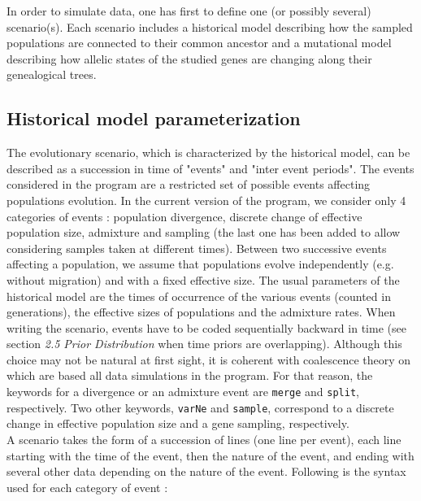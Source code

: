  
 In order to simulate data, one has first to define one (or possibly
several) scenario(s). Each scenario includes a historical model describing
how the sampled populations  are connected to their common ancestor
and a mutational model describing how allelic states of the studied
genes are changing along their genealogical trees.\\

\subsection{Historical model parameterization}
The evolutionary scenario, which is characterized by the historical
model, can be described as a succession in time of "events" and
"inter event periods". The events considered in the program are a
restricted set of possible events affecting populations evolution.
In the current version of the program, we consider only 4 categories
of events : population divergence, 
discrete change of effective population size, admixture and sampling (the last one has been added
to allow considering samples taken at different times). Between two successive
events affecting a population, we assume that populations evolve
independently (e.g. without migration) and with a fixed effective
size. The usual parameters of the historical model are the times of
occurrence of the various events (counted in generations), the
effective sizes of populations and the admixture rates. When writing
the scenario, events have to be coded  sequentially backward in time 
(see section \emph{2.5  Prior Distribution} when time priors are overlapping).
Although this choice may not be natural at first sight, it is coherent with
coalescence theory on which are based all data simulations in the
program. For that reason, the keywords for a divergence or an
admixture event are \texttt{merge} and \texttt{split}, respectively.
Two other keywords, \texttt{varNe} and \texttt{sample},
correspond to a discrete change in effective population size and a gene
sampling, respectively. 
\\
A scenario takes the form of a succession of lines (one line per
event), each line starting with the time of the event, then the
nature of the event, and ending with several other data depending on
the nature of the event. Following is the syntax used for each
category of event :
